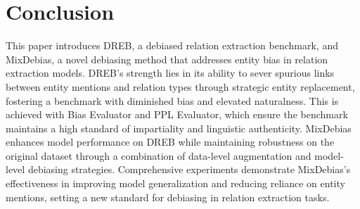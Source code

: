 \documentclass[letterpaper]{article} %
\begin{document}
\section{Conclusion}


This paper introduces DREB, a debiased relation extraction benchmark, and MixDebias, a novel debiasing method that addresses entity bias in relation extraction models.
DREB's strength lies in its ability to sever spurious links between entity mentions and relation types through strategic entity replacement, fostering a benchmark with diminished bias and elevated naturalness. This is achieved with Bias Evaluator and PPL Evaluator, which ensure the benchmark maintains a high standard of impartiality and linguistic authenticity. MixDebias enhances model performance on DREB while maintaining robustness on the original dataset through a combination of data-level augmentation and model-level debiasing strategies. Comprehensive experiments demonstrate MixDebias's effectiveness in improving model generalization and reducing reliance on entity mentions, setting a new standard for debiasing in relation extraction tasks.




\end{document}
